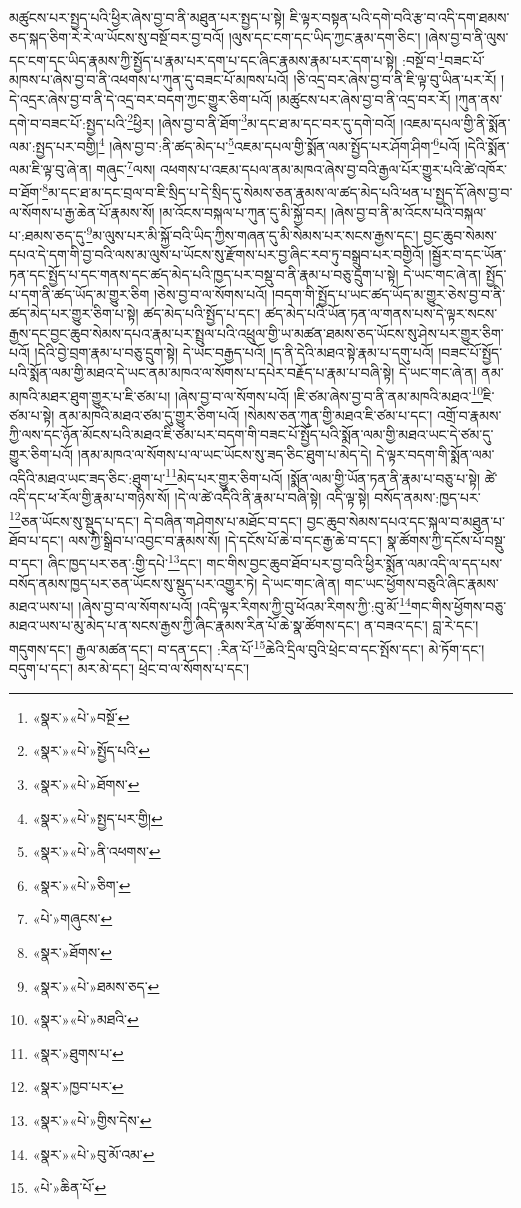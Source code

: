 མཚུངས་པར་སྤྱད་པའི་ཕྱིར་ཞེས་བྱ་བ་ནི་མཐུན་པར་སྤྱད་པ་སྟེ། ཇི་ལྟར་བསྟན་པའི་དགེ་བའི་རྩ་བ་འདི་དག་ཐམས་ཅད་སྐད་ཅིག་རེ་རེ་ལ་ཡོངས་སུ་བསྔོ་བར་བྱ་བའོ། །ལུས་དང་ངག་དང་ཡིད་ཀྱང་རྣམ་དག་ཅིང་། །ཞེས་བྱ་བ་ནི་ལུས་དང་ངག་དང་ཡིད་རྣམས་ཀྱི་སྤྱོད་པ་རྣམ་པར་དག་པ་དང་ཞིང་རྣམས་རྣམ་པར་དག་པ་སྟེ། :བསྔོ་བ་\footnote{«སྣར་»«པེ་»བསྔོ་}བཟང་པོ་མཁས་པ་ཞེས་བྱ་བ་ནི་འཕགས་པ་ཀུན་དུ་བཟང་པོ་མཁས་པའོ། །ཅི་འདྲ་བར་ཞེས་བྱ་བ་ནི་ཇི་ལྟ་བུ་ཡིན་པར་རོ། །དེ་འདྲར་ཞེས་བྱ་བ་ནི་དེ་འདྲ་བར་བདག་ཀྱང་གྱུར་ཅིག་པའོ། །མཚུངས་པར་ཞེས་བྱ་བ་ནི་འདྲ་བར་རོ། །ཀུན་ནས་དགེ་བ་བཟང་པོ་:སྤྱད་པའི་\footnote{«སྣར་»«པེ་»སྤྱོད་པའི་}ཕྱིར། །ཞེས་བྱ་བ་ནི་ཐོག་\footnote{«སྣར་»«པེ་»ཐོགས་}མ་དང་ཐ་མ་དང་བར་དུ་དགེ་བའོ། །འཇམ་དཔལ་གྱི་ནི་སྨོན་ལམ་:སྤྱད་པར་བགྱི།\footnote{«སྣར་»«པེ་»སྤྱད་པར་གྱི།} །ཞེས་བྱ་བ་:ནི་ཚད་མེད་པ་\footnote{«སྣར་»«པེ་»ནི་འཕགས་}འཇམ་དཔལ་གྱི་སྨོན་ལམ་སྤྱོད་པར་ཤོག་ཤིག་\footnote{«སྣར་»«པེ་»ཅིག་}པའོ། །དེའི་སྨོན་ལམ་ཇི་ལྟ་བུ་ཞེ་ན། གཞུང་\footnote{«པེ་»གཞུངས་}ལས། འཕགས་པ་འཇམ་དཔལ་ནམ་མཁའ་ཞེས་བྱ་བའི་རྒྱལ་པོར་གྱུར་པའི་ཚེ་འཁོར་བ་ཐོག་\footnote{«སྣར་»ཐོགས་}མ་དང་ཐ་མ་དང་བྲལ་བ་ཇི་སྲིད་པ་དེ་སྲིད་དུ་སེམས་ཅན་རྣམས་ལ་ཚད་མེད་པའི་ཕན་པ་སྤྱད་དོ་ཞེས་བྱ་བ་ལ་སོགས་པ་རྒྱ་ཆེན་པོ་རྣམས་སོ། །མ་འོངས་བསྐལ་པ་ཀུན་དུ་མི་སྐྱོ་བར། །ཞེས་བྱ་བ་ནི་མ་འོངས་པའི་བསྐལ་པ་:ཐམས་ཅད་དུ་\footnote{«སྣར་»«པེ་»ཐམས་ཅད་}མ་ལུས་པར་མི་སྐྱོ་བའི་ཡིད་ཀྱིས་གཞན་དུ་མི་སེམས་པར་སངས་རྒྱས་དང་། བྱང་ཆུབ་སེམས་དཔའ་དེ་དག་གི་བྱ་བའི་ལས་མ་ལུས་པ་ཡོངས་སུ་རྫོགས་པར་བྱ་ཞིང་རབ་ཏུ་བསྒྲུབ་པར་བགྱིའོ། །སྦྱོར་བ་དང་ཡོན་ཏན་དང་སྤྱོད་པ་དང་གནས་དང་ཚད་མེད་པའི་ཁྱད་པར་བསྡུ་བ་ནི་རྣམ་པ་བཅུ་དྲུག་པ་སྟེ། དེ་ཡང་གང་ཞེ་ན། སྤྱོད་པ་དག་ནི་ཚད་ཡོད་མ་གྱུར་ཅིག །ཅེས་བྱ་བ་ལ་སོགས་པའོ། །བདག་གི་སྤྱོད་པ་ཡང་ཚད་ཡོད་མ་གྱུར་ཅེས་བྱ་བ་ནི་ཚད་མེད་པར་གྱུར་ཅིག་པ་སྟེ། ཚད་མེད་པའི་སྤྱོད་པ་དང་། ཚད་མེད་པའི་ཡོན་ཏན་ལ་གནས་པས་དེ་ལྟར་སངས་རྒྱས་དང་བྱང་ཆུབ་སེམས་དཔའ་རྣམ་པར་སྤྲུལ་པའི་འཕྲུལ་གྱི་ཡ་མཚན་ཐམས་ཅད་ཡོངས་སུ་ཤེས་པར་གྱུར་ཅིག་པའོ། །དེའི་བྱེ་བྲག་རྣམ་པ་བཅུ་དྲུག་སྟེ། དེ་ཡང་བརྒྱད་པའོ། །ད་ནི་དེའི་མཐའ་སྟེ་རྣམ་པ་དགུ་པའོ། །བཟང་པོ་སྤྱོད་པའི་སྨོན་ལམ་གྱི་མཐའ་དེ་ཡང་ནམ་མཁའ་ལ་སོགས་པ་དཔེར་བརྗོད་པ་རྣམ་པ་བཞི་སྟེ། དེ་ཡང་གང་ཞེ་ན། ནམ་མཁའི་མཐར་ཐུག་གྱུར་པ་ཇི་ཙམ་པ། །ཞེས་བྱ་བ་ལ་སོགས་པའོ། །ཇི་ཙམ་ཞེས་བྱ་བ་ནི་ནམ་མཁའི་མཐའ་\footnote{«སྣར་»«པེ་»མཐའི་}ཇི་ཙམ་པ་སྟེ། ནམ་མཁའི་མཐའ་ཙམ་དུ་གྱུར་ཅིག་པའོ། །སེམས་ཅན་ཀུན་གྱི་མཐའ་ཇི་ཙམ་པ་དང་། འགྲོ་བ་རྣམས་ཀྱི་ལས་དང་ཉོན་མོངས་པའི་མཐའ་ཇི་ཙམ་པར་བདག་གི་བཟང་པོ་སྤྱོད་པའི་སྨོན་ལམ་གྱི་མཐའ་ཡང་དེ་ཙམ་དུ་གྱུར་ཅིག་པའོ། །ནམ་མཁའ་ལ་སོགས་པ་ལ་ཡང་ཡོངས་སུ་ཟད་ཅིང་ཐུག་པ་མེད་དེ། དེ་ལྟར་བདག་གི་སྨོན་ལམ་འདིའི་མཐའ་ཡང་ཟད་ཅིང་:ཐུག་པ་\footnote{«སྣར་»ཐུགས་པ་}མེད་པར་གྱུར་ཅིག་པའོ། །སྨོན་ལམ་གྱི་ཡོན་ཏན་ནི་རྣམ་པ་བཅུ་པ་སྟེ། ཚེ་འདི་དང་ཕ་རོལ་གྱི་རྣམ་པ་གཉིས་སོ། །དེ་ལ་ཚེ་འདིའི་ནི་རྣམ་པ་བཞི་སྟེ། འདི་ལྟ་སྟེ། བསོད་ནམས་:ཁྱད་པར་\footnote{«སྣར་»ཁྱབ་པར་}ཅན་ཡོངས་སུ་སྡུད་པ་དང་། དེ་བཞིན་གཤེགས་པ་མཐོང་བ་དང་། བྱང་ཆུབ་སེམས་དཔའ་དང་སྐལ་བ་མཐུན་པ་ཐོབ་པ་དང་། ལས་ཀྱི་སྒྲིབ་པ་འབྱང་བ་རྣམས་སོ། །དེ་དངོས་པོ་ཆེ་བ་དང་རྒྱ་ཆེ་བ་དང་། སྣ་ཚོགས་ཀྱི་དངོས་པོ་བསྡུ་བ་དང་། ཞིང་ཁྱད་པར་ཅན་:གྱི་དཔེ་\footnote{«སྣར་»«པེ་»གྱིས་དེས་}དང་། གང་གིས་བྱང་ཆུབ་ཐོབ་པར་བྱ་བའི་ཕྱིར་སྨོན་ལམ་འདི་ལ་དད་པས་བསོད་ནམས་ཁྱད་པར་ཅན་ཡོངས་སུ་སྡུད་པར་འགྱུར་ཏེ། དེ་ཡང་གང་ཞེ་ན། གང་ཡང་ཕྱོགས་བཅུའི་ཞིང་རྣམས་མཐའ་ཡས་པ། །ཞེས་བྱ་བ་ལ་སོགས་པའོ། །འདི་ལྟར་རིགས་ཀྱི་བུ་ཕོའམ་རིགས་ཀྱི་:བུ་མོ་\footnote{«སྣར་»«པེ་»བུ་མོ་འམ་}གང་གིས་ཕྱོགས་བཅུ་མཐའ་ཡས་པ་མུ་མེད་པ་ན་སངས་རྒྱས་ཀྱི་ཞིང་རྣམས་རིན་པོ་ཆེ་སྣ་ཚོགས་དང་། ན་བཟའ་དང་། བླ་རེ་དང་། གདུགས་དང་། རྒྱལ་མཚན་དང་། བ་དན་དང་། :རིན་པོ་\footnote{«པེ་»ཆིན་པོ་}ཆེའི་དྲིལ་བུའི་ཕྲེང་བ་དང་སྤོས་དང་། མེ་ཏོག་དང་། བདུག་པ་དང་། མར་མེ་དང་། ཕྲེང་བ་ལ་སོགས་པ་དང་། 
